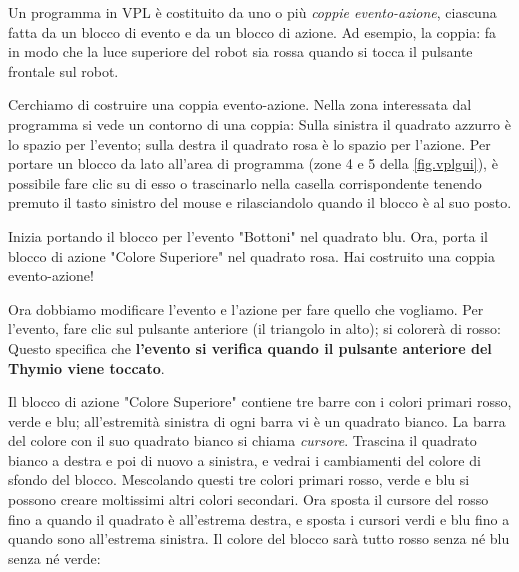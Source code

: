Un programma in VPL è costituito da uno o più \emph{coppie evento-azione},
ciascuna fatta
da un blocco di evento e da un blocco di azione. Ad esempio, la coppia:
 fa in modo che la luce superiore del robot sia rossa quando si tocca il pulsante frontale sul robot.


Cerchiamo di costruire una coppia evento-azione.
Nella zona interessata dal programma si vede un contorno di una coppia:
Sulla sinistra il quadrato azzurro  è lo spazio per l'evento; sulla destra il quadrato rosa è lo spazio per l'azione. %
Per portare un blocco da lato all'area di programma  (zone 4 e 5 della \cref{fig.vplgui}), è possibile fare clic su di esso o trascinarlo nella casella corrispondente tenendo premuto il tasto sinistro del mouse e rilasciandolo quando il blocco è
al suo posto.

Inizia portando il blocco per l'evento "Bottoni"   nel quadrato blu.
Ora, porta il blocco di azione "Colore Superiore"  nel quadrato rosa.
Hai costruito una coppia evento-azione!

Ora dobbiamo modificare l'evento e l'azione per fare quello che vogliamo. Per
l'evento, fare clic sul pulsante anteriore (il triangolo in alto); si colorerà di
rosso: 
Questo specifica che \textbf{l'evento si verifica quando il pulsante anteriore del Thymio viene toccato}.

Il blocco di azione "Colore Superiore" contiene tre barre con i colori primari rosso,
verde e blu; all'estremità sinistra di ogni barra vi è un quadrato bianco. La barra del colore
con il suo quadrato bianco si chiama \emph{cursore}. Trascina il quadrato bianco
a destra e poi di nuovo a sinistra, e vedrai i cambiamenti del
colore di sfondo del blocco.
Mescolando questi tre colori primari rosso, verde e blu si possono creare moltissimi altri colori secondari.
Ora sposta il cursore del rosso fino a quando il
quadrato è all'estrema destra, e sposta i cursori verdi e blu fino a quando
sono all'estrema sinistra. Il colore del blocco sarà tutto rosso senza né blu senza né
verde: 


